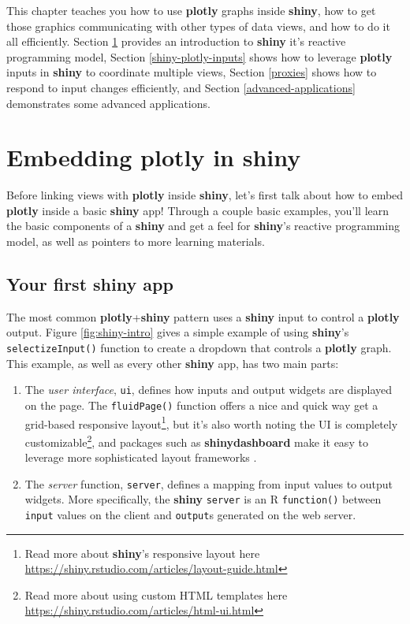\documentclass[
  12pt,
]{krantz}
\providecommand{\tightlist}{%
  \setlength{\itemsep}{0pt}\setlength{\parskip}{0pt}}
\begin{document}
This chapter teaches you how to use \textbf{plotly} graphs inside \textbf{shiny}, how to get those graphics communicating with other types of data views, and how to do it all efficiently. Section \ref{hello-shiny} provides an introduction to \textbf{shiny} it's reactive programming model, Section \ref{shiny-plotly-inputs} shows how to leverage \textbf{plotly} inputs in \textbf{shiny} to coordinate multiple views, Section \ref{proxies} shows how to respond to input changes efficiently, and Section \ref{advanced-applications} demonstrates some advanced applications.

\hypertarget{hello-shiny}{%
\section{Embedding plotly in shiny}\label{hello-shiny}}

Before linking views with \textbf{plotly} inside \textbf{shiny}, let's first talk about how to embed \textbf{plotly} inside a basic \textbf{shiny} app! Through a couple basic examples, you'll learn the basic components of a \textbf{shiny} and get a feel for \textbf{shiny}'s reactive programming model, as well as pointers to more learning materials.

\hypertarget{your-first-shiny-app}{%
\subsection{Your first shiny app}\label{your-first-shiny-app}}

The most common \textbf{plotly}+\textbf{shiny} pattern uses a \textbf{shiny} input to control a \textbf{plotly} output. Figure \ref{fig:shiny-intro} gives a simple example of using \textbf{shiny}'s \texttt{selectizeInput()} function to create a dropdown that controls a \textbf{plotly} graph. This example, as well as every other \textbf{shiny} app, has two main parts:

\begin{enumerate}
\def\labelenumi{\arabic{enumi}.}
\tightlist
\item
  The \emph{user interface}, \texttt{ui}, defines how inputs and output widgets are displayed on the page. The \texttt{fluidPage()} function offers a nice and quick way get a grid-based responsive layout\footnote{Read more about \textbf{shiny}'s responsive layout here \url{https://shiny.rstudio.com/articles/layout-guide.html}}, but it's also worth noting the UI is completely customizable\footnote{Read more about using custom HTML templates here \url{https://shiny.rstudio.com/articles/html-ui.html}}, and packages such as \textbf{shinydashboard} make it easy to leverage more sophisticated layout frameworks \citep{shinydashboard}.
\item
  The \emph{server} function, \texttt{server}, defines a mapping from input values to output widgets. More specifically, the \textbf{shiny} \texttt{server} is an R \texttt{function()} between \texttt{input} values on the client and \texttt{output}s generated on the web server.
\end{enumerate}
\end{document}
